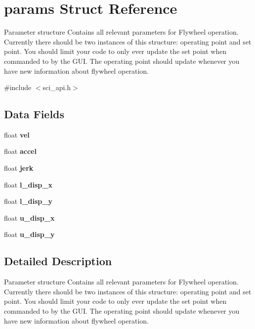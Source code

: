 \hypertarget{structparams}{}\section{params Struct Reference}
\label{structparams}


Parameter structure Contains all relevant parameters for Flywheel operation. Currently there should be two instances of this structure\+: operating point and set point. You should limit your code to only ever update the set point when commanded to by the G\+UI. The operating point should update whenever you have new information about flywheel operation.  




{\ttfamily \#include $<$sci\+\_\+api.\+h$>$}

\subsection*{Data Fields}
\begin{DoxyCompactItemize}
\item 
\hypertarget{structparams_afc29fb7fadd39a1bc2e3c52532248689}{}\label{structparams_afc29fb7fadd39a1bc2e3c52532248689} 
float {\bfseries vel}
\item 
\hypertarget{structparams_a38251dfec99a8ff5f13f10c6c7217921}{}\label{structparams_a38251dfec99a8ff5f13f10c6c7217921} 
float {\bfseries accel}
\item 
\hypertarget{structparams_ad12385a16c1e70621af252dc46ddd611}{}\label{structparams_ad12385a16c1e70621af252dc46ddd611} 
float {\bfseries jerk}
\item 
\hypertarget{structparams_af21c3a60511601343a932892b2bd2aa9}{}\label{structparams_af21c3a60511601343a932892b2bd2aa9} 
float {\bfseries l\+\_\+disp\+\_\+x}
\item 
\hypertarget{structparams_a1f347938db365ee9a0c134aac67ba3a0}{}\label{structparams_a1f347938db365ee9a0c134aac67ba3a0} 
float {\bfseries l\+\_\+disp\+\_\+y}
\item 
\hypertarget{structparams_a6db4325e4ce3b14554f6b8a22fb991bb}{}\label{structparams_a6db4325e4ce3b14554f6b8a22fb991bb} 
float {\bfseries u\+\_\+disp\+\_\+x}
\item 
\hypertarget{structparams_a7cac915dc0f140b664b56ef049ee880f}{}\label{structparams_a7cac915dc0f140b664b56ef049ee880f} 
float {\bfseries u\+\_\+disp\+\_\+y}
\end{DoxyCompactItemize}


\subsection{Detailed Description}
Parameter structure Contains all relevant parameters for Flywheel operation. Currently there should be two instances of this structure\+: operating point and set point. You should limit your code to only ever update the set point when commanded to by the G\+UI. The operating point should update whenever you have new information about flywheel operation. 

